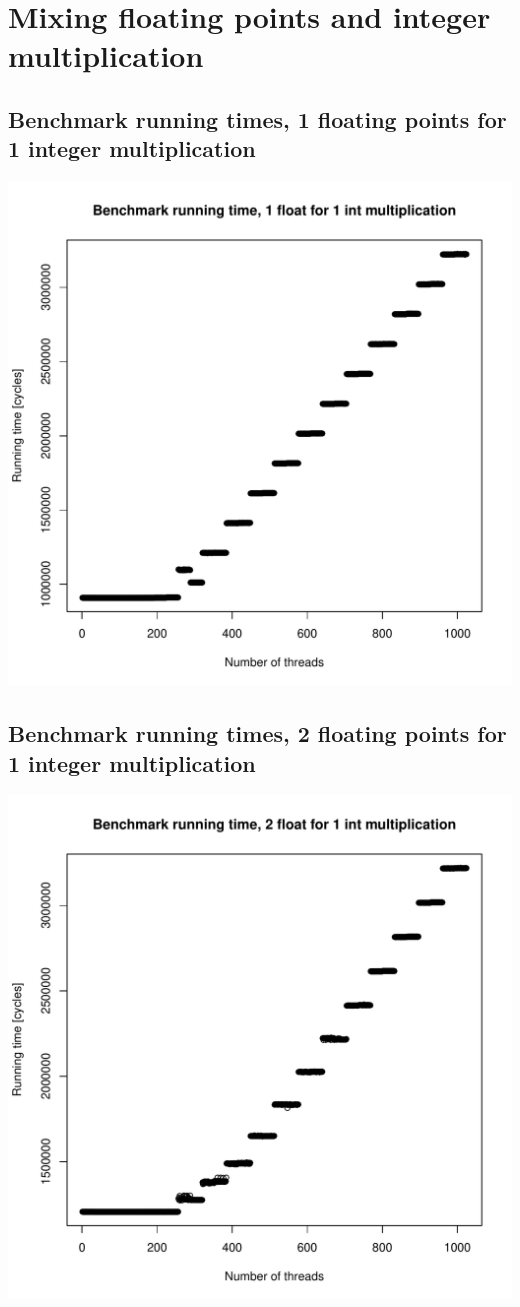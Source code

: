\documentclass{article}
\begin{document}
\section{Mixing floating points and integer multiplication}
	\subsection{Benchmark running times, 1 floating points for 1 integer multiplication}
	\includegraphics[width=\linewidth]{"graphics/running_times_ratio11"}
	\pagebreak

	\subsection{Benchmark running times, 2 floating points for 1 integer multiplication}
	\includegraphics[width=\linewidth]{"graphics/running_times_ratio21"}
	\pagebreak
\end{document}
